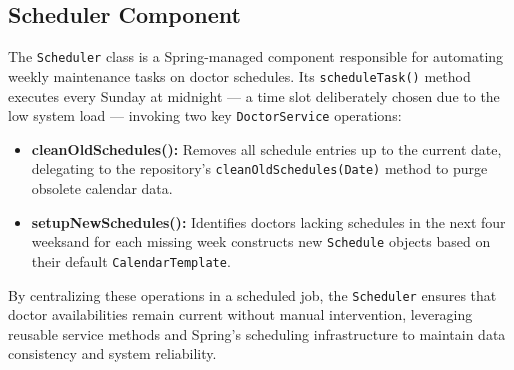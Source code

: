 \subsection{Scheduler Component}
The \texttt{Scheduler} class is a Spring-managed component responsible for automating weekly maintenance tasks on doctor schedules. Its \texttt{scheduleTask()} method executes every Sunday at midnight — a time slot deliberately chosen due to the low system load — invoking two key \texttt{DoctorService} operations:
\begin{itemize}
	\item \textbf{cleanOldSchedules():} Removes all schedule entries up to the current date, delegating to the repository’s \texttt{cleanOldSchedules(Date)} method to purge obsolete calendar data.
	\item \textbf{setupNewSchedules():} Identifies doctors lacking schedules in the next four weeksand for each missing week constructs new \texttt{Schedule} objects based on their default \texttt{CalendarTemplate}.
\end{itemize}

By centralizing these operations in a scheduled job, the \texttt{Scheduler} ensures that doctor availabilities remain current without manual intervention, leveraging reusable service methods and Spring’s scheduling infrastructure to maintain data consistency and system reliability.


